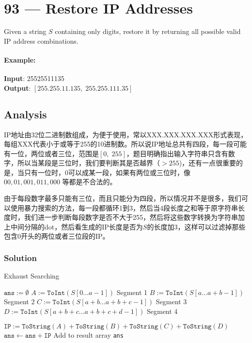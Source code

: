 \section{93 --- Restore IP Addresses}
Given a string $S$ containing only digits, restore it by returning all possible valid IP address combinations.
\paragraph{Example:}
\begin{flushleft}
\textbf{Input}: 25525511135
\\
\textbf{Output}: $[255.255.11.135,\;255.255.111.35]$
\end{flushleft}
\subsection{Analysis}
\begin{CJK*}{UTF8}{gbsn}
IP地址由32位二进制数组成，为便于使用，常以XXX.XXX.XXX.XXX形式表现，每组XXX代表小于或等于255的10进制数。所以说IP地址总共有四段，每一段可能有一位，两位或者三位，范围是$[0,\;255]$，题目明确指出输入字符串只含有数字，所以当某段是三位时，我们要判断其是否越界（$>255$)，还有一点很重要的是，当只有一位时，0可以成某一段，如果有两位或三位时，像 $00, 01, 001, 011, 000$ 等都是不合法的。
\par
由于每段数字最多只能有三位，而且只能分为四段，所以情况并不是很多，我们可以使用暴力搜索的方法，每一段都循环1到3，然后当4段长度之和等于原字符串长度时，我们进一步判断每段数字是否不大于255，然后将这些数字转换为字符串加上中间分隔的dot，然后看生成的IP长度是否为$S$的长度加3，这样可以过滤掉那些包含0开头的两位或者三位段的IP。
\end{CJK*}
\subsubsection{Solution}
\setcounter{algorithm}{0}
\begin{algorithm}[H]
\caption{Exhaust Searching}
\begin{algorithmic}[1]
\State $\texttt{ans}:=\emptyset$
\State $A:= \texttt{ToInt}(S[0\ldots a-1])$ \Comment Segment 1
\State $B:= \texttt{ToInt}(S[a\ldots a+b-1])$ \Comment Segment 2
\State $C:= \texttt{ToInt}(S[a+b\ldots a+b+c-1])$ \Comment Segment 3
\State $D:= \texttt{ToInt}(S[a+b+c\ldots a+b+c+d-1])$ \Comment Segment 4
\end{algorithmic}
\end{algorithm}
\begin{algorithm}[H]
\begin{algorithmic}[1]
\State $\texttt{IP}:= \texttt{ToString}(A) + \texttt{ToString}(B) + \texttt{ToString}(C) + \texttt{ToString}(D)$
\State $\texttt{ans} \gets \texttt{ans} + \texttt{IP}$ \Comment Add to result array
\EndIf
\EndIf
\EndFor
\EndFor
\EndFor
\EndFor
\State \Return \texttt{ans}
\EndProcedure
\end{algorithmic}
\end{algorithm}
